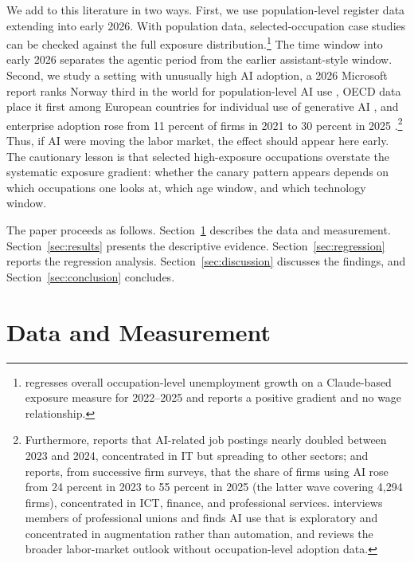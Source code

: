 \documentclass[12pt]{article}
\begin{document}
We add to this literature in two ways. First, we use population-level register data extending into early 2026. With population data, selected-occupation case studies can be checked against the full exposure distribution.\footnote{\citet{menon2026} regresses overall occupation-level unemployment growth on a Claude-based exposure measure for 2022--2025 and reports a positive gradient and no wage relationship.} The time window into early 2026 separates the agentic period from the earlier assistant-style window. Second, we study a setting with unusually high AI adoption, a 2026 Microsoft report ranks Norway third in the world for population-level AI use \citep{microsoft2026ai}, OECD data place it first among European countries for individual use of generative AI \citep{oecd2026ai}, and enterprise adoption rose from 11 percent of firms in 2021 to 30 percent in 2025 \citep{ssb2025ikt}.\footnote{Furthermore, \citet{kompetansebehovsutvalget2026} reports that AI-related job postings nearly doubled between 2023 and 2024, concentrated in IT but spreading to other sectors; and \citet{samfunnsok2026} reports, from successive firm surveys, that the share of firms using AI rose from 24 percent in 2023 to 55 percent in 2025 (the latter wave covering 4{,}294 firms), concentrated in ICT, finance, and professional services. \citet{nifu2024} interviews members of professional unions and finds AI use that is exploratory and concentrated in augmentation rather than automation, and \citet{nav2025} reviews the broader labor-market outlook without occupation-level adoption data.} Thus, if AI were moving the labor market, the effect should appear here early. The cautionary lesson is that selected high-exposure occupations overstate the systematic exposure gradient: whether the canary pattern appears depends on which occupations one looks at, which age window, and which technology window.

The paper proceeds as follows. Section~\ref{sec:data} describes the data and measurement. Section~\ref{sec:results} presents the descriptive evidence. Section~\ref{sec:regression} reports the regression analysis. Section~\ref{sec:discussion} discusses the findings, and Section~\ref{sec:conclusion} concludes.

\section{Data and Measurement}\label{sec:data}
\end{document}
